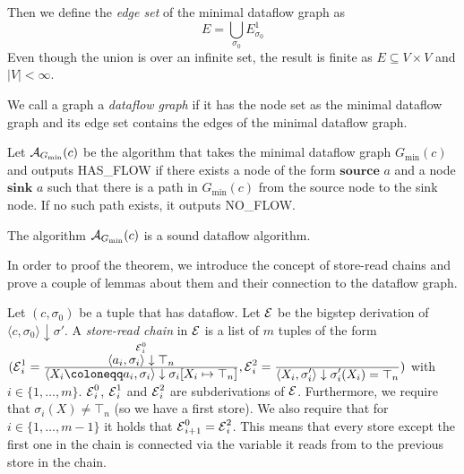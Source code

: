 Then we define the \emph{edge set} of the minimal dataflow graph as
\begin{equation*}
    E = \bigcup_{\sigma_0} E^1_{\sigma_0}
\end{equation*}
Even though the union is over an infinite set, the result is finite
as $E \subseteq V \times V$ and $|V| < \infty$.

We call a graph a \emph{dataflow graph} if it has the node set as the minimal
dataflow graph and its edge set contains the edges of the minimal dataflow 
graph.

Let $\operatorname{\mathcal{A}}_{G_\text{min}}(c)$ be the algorithm that takes the
minimal dataflow graph $G_\text{min}(c)$ and outputs HAS\_FLOW if there 
exists a node of the form 
$\textbf{source }a$ and a node $\textbf{sink }a$ such that there is a path in 
$G_\text{min}(c)$ from the source node to the sink node.
If no such path exists, it outputs NO\_FLOW.


\begin{theorem}
    \label{thm:min-dg}
    The algorithm $\operatorname{\mathcal{A}}_{G_\text{min}}(c)$ is a sound dataflow algorithm.
\end{theorem}
In order to proof the theorem, we introduce the concept of store-read chains 
and prove a couple of lemmas about them and their connection to the dataflow
graph.

\begin{definition}
    Let $(c, \sigma_0)$ be a tuple that has dataflow.
    Let $\operatorname{\mathcal{E}}$ be the bigstep derivation of
    $\langle c, \sigma_0 \rangle \downarrow \sigma'$.
    A \emph{store-read chain} in $\operatorname{\mathcal{E}}$ is a list of $m$ tuples of the form
    $(\E^1_i=\ddfrac{\overset{\E^0_i}{\langle a_i, \sigma_i \rangle \downarrow \top_n}}
    {\langle X_i \coloneqq a_i, \sigma_i \rangle \downarrow \sigma_i[X_i \mapsto \top_n]},
    \E^2_i=\ddfrac{}{\langle X_i, \sigma_i' \rangle \downarrow \sigma_i'(X_i) = \top_n})$
    with $i \in \{1, \ldots, m\}$.
    $\operatorname{\mathcal{E}}^0_i$, $\operatorname{\mathcal{E}}^1_i$ and $\operatorname{\mathcal{E}}^2_i$ are subderivations of $\operatorname{\mathcal{E}}$.
    Furthermore, we require that $\sigma_i(X) \neq \top_n$ (so we have a first store).
    We also require that for $i \in \{1, \ldots, m-1\}$ it holds that 
    $\operatorname{\mathcal{E}}^0_{i+1}=\operatorname{\mathcal{E}}^2_i$. This means that every store except the first one
    in the chain is connected via the variable it reads from to the previous 
    store in the chain.
\end{definition}

